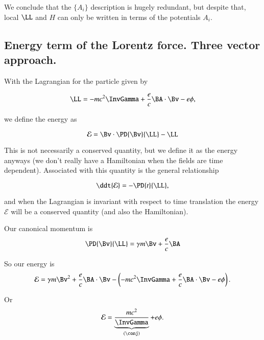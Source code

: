 We conclude that the $\{A_i\}$ description is hugely redundant, but despite that, local $\LL$ and $H$ can only be written in terms of the potentials $A_i$.

\subsection{Energy term of the Lorentz force.  Three vector approach.}

With the Lagrangian for the particle given by

\begin{equation}\label{eqn:relativisticElectrodynamicsL10:130}
\LL = - mc^2 \InvGamma + \frac{e}{c} \BA \cdot \Bv - e \phi,
\end{equation}

we define the energy as 

\begin{equation}\label{eqn:relativisticElectrodynamicsL10:150}
\mathcal{E} = \Bv \cdot \PD{\Bv}{\LL} - \LL
\end{equation}

This is not necessarily a conserved quantity, but we define it as the energy anyways (we don't really have a Hamiltonian when the fields are time dependent).  Associated with this quantity is the general relationship

\begin{equation}\label{eqn:relativisticElectrodynamicsL10:170}
\ddt{\mathcal{E}} = -\PD{t}{\LL},
\end{equation}

and when the Lagrangian is invariant with respect to time translation the energy $\mathcal{E}$ will be a conserved quantity (and also the Hamiltonian).

Our canonical momentum is 
\begin{equation}\label{eqn:relativisticElectrodynamicsL10:190}
\PD{\Bv}{\LL} = \gamma m \Bv + \frac{e}{c} \BA
\end{equation}

So our energy is
\begin{align*}
\mathcal{E} = \gamma m \Bv^2 + \frac{e}{c} \BA \cdot \Bv - \left( - mc^2 \InvGamma + \frac{e}{c} \BA \cdot \Bv - e \phi \right).
\end{align*}

Or
\begin{equation}\label{eqn:relativisticElectrodynamicsL10:210}
\mathcal{E} = \underbrace{\frac{m c^2}{\InvGamma}}_{(\conj)} + e \phi.
\end{equation}

